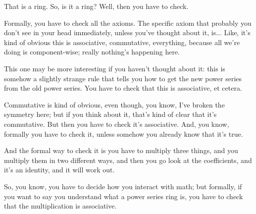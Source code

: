\begin{speech}[00:30:25 - 00:31:28]
That is a ring. So, is it a ring? Well, then you have to check.

Formally, you have to check all the axioms. The specific axiom that probably you don't see in your head immediately, unless you've thought about it, is... Like, it's kind of obvious this is associative, commutative, everything, because all we're doing is component-wise; really nothing's happening here.

This one may be more interesting if you haven't thought about it: this is somehow a slightly strange rule that tells you how to get the new power series from the old power series. You have to check that this is associative, et cetera.

Commutative is kind of obvious, even though, you know, I've broken the symmetry here; but if you think about it, that's kind of clear that it's commutative. But then you have to check it's associative. And, you know, formally you have to check it, unless somehow you already know that it's true.

And the formal way to check it is you have to multiply three things, and you multiply them in two different ways, and then you go look at the coefficients, and it's an identity, and it will work out.

So, you know, you have to decide how you interact with math; but formally, if you want to say you understand what a power series ring is, you have to check that the multiplication is associative.
\end{speech}

